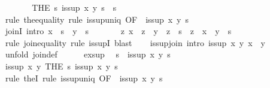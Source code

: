 \begin{isabellebody}
\ \ \ \ \isamarkupfalse%
\ \isamarkupfalse%
\ {\isachardoublequoteopen}{\isacharparenleft}THE\ s{\isachardot}\ is{\isacharunderscore}sup\ x\ y\ s{\isacharparenright}\ {\isacharequal}\ s{\isachardoublequoteclose}\isanewline
\ \ \ \ \ \ \isamarkupfalse%
\ {\isacharparenleft}rule\ the{\isacharunderscore}equality{\isacharparenright}\ {\isacharparenleft}rule\ is{\isacharunderscore}sup{\isacharunderscore}uniq\ {\isacharbrackleft}OF\ {\isacharunderscore}\ {\isacharbackquoteopen}is{\isacharunderscore}sup\ x\ y\ s{\isacharbackquoteclose}{\isacharbrackright}{\isacharparenright}\isanewline
\ \ \isamarkupfalse%
\isanewline
\isanewline
\ \ \isamarkupfalse%
\ joinI\ {\isacharbrackleft}intro{\isacharquery}{\isacharbrackright}{\isacharcolon}\ {\isachardoublequoteopen}x\ {\isasymsqsubseteq}\ s\ {\isasymLongrightarrow}\ y\ {\isasymsqsubseteq}\ s\ {\isasymLongrightarrow}\isanewline
\ \ \ \ \ \ {\isacharparenleft}{\isasymAnd}z{\isachardot}\ x\ {\isasymsqsubseteq}\ z\ {\isasymLongrightarrow}\ y\ {\isasymsqsubseteq}\ z\ {\isasymLongrightarrow}\ s\ {\isasymsqsubseteq}\ z{\isacharparenright}\ {\isasymLongrightarrow}\ x\ {\isasymsqunion}\ y\ {\isacharequal}\ s{\isachardoublequoteclose}\isanewline
\ \ \ \ \isamarkupfalse%
\ {\isacharparenleft}rule\ join{\isacharunderscore}equality{\isacharcomma}\ rule\ is{\isacharunderscore}supI{\isacharparenright}\ blast{\isacharplus}\isanewline
\isanewline
\ \ \isamarkupfalse%
\ is{\isacharunderscore}sup{\isacharunderscore}join\ {\isacharbrackleft}intro{\isacharquery}{\isacharbrackright}{\isacharcolon}\ {\isachardoublequoteopen}is{\isacharunderscore}sup\ x\ y\ {\isacharparenleft}x\ {\isasymsqunion}\ y{\isacharparenright}{\isachardoublequoteclose}\isanewline
\ \ \isamarkupfalse%
\ {\isacharparenleft}unfold\ join{\isacharunderscore}def{\isacharparenright}\isanewline
\ \ \ \ \isamarkupfalse%
\ ex{\isacharunderscore}sup\ \isamarkupfalse%
\ s\ \ {\isachardoublequoteopen}is{\isacharunderscore}sup\ x\ y\ s{\isachardoublequoteclose}\ \isacommand{{\isachardot}{\isachardot}}\isamarkupfalse%
\isanewline
\ \ \ \ \isamarkupfalse%
\ \isamarkupfalse%
\ {\isachardoublequoteopen}is{\isacharunderscore}sup\ x\ y\ {\isacharparenleft}THE\ s{\isachardot}\ is{\isacharunderscore}sup\ x\ y\ s{\isacharparenright}{\isachardoublequoteclose}\isanewline
\ \ \ \ \ \ \isamarkupfalse%
\ {\isacharparenleft}rule\ theI{\isacharparenright}\ {\isacharparenleft}rule\ is{\isacharunderscore}sup{\isacharunderscore}uniq\ {\isacharbrackleft}OF\ {\isacharunderscore}\ {\isacharbackquoteopen}is{\isacharunderscore}sup\ x\ y\ s{\isacharbackquoteclose}{\isacharbrackright}{\isacharparenright}\isanewline

\end{isabellebody}
